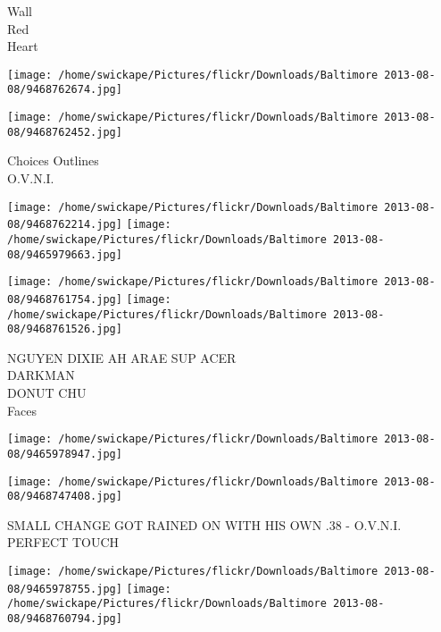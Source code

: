 \documentclass[10pt,letterpaper]{article}
\begin{document}
Wall\\
Red\\
Heart\\
\pagebreak

\texttt{[image: /home/swickape/Pictures/flickr/Downloads/Baltimore 2013-08-08/9468762674.jpg]}

\vspace{0.25in}
\texttt{[image: /home/swickape/Pictures/flickr/Downloads/Baltimore 2013-08-08/9468762452.jpg]}

Choices Outlines\\
O.V.N.I.\\
\pagebreak

\texttt{[image: /home/swickape/Pictures/flickr/Downloads/Baltimore 2013-08-08/9468762214.jpg]}
\texttt{[image: /home/swickape/Pictures/flickr/Downloads/Baltimore 2013-08-08/9465979663.jpg]}

\texttt{[image: /home/swickape/Pictures/flickr/Downloads/Baltimore 2013-08-08/9468761754.jpg]}
\texttt{[image: /home/swickape/Pictures/flickr/Downloads/Baltimore 2013-08-08/9468761526.jpg]}

NGUYEN DIXIE AH ARAE SUP ACER\\
DARKMAN\\
DONUT CHU\\
Faces\\
\pagebreak

\texttt{[image: /home/swickape/Pictures/flickr/Downloads/Baltimore 2013-08-08/9465978947.jpg]}

\vspace{0.25in}
\texttt{[image: /home/swickape/Pictures/flickr/Downloads/Baltimore 2013-08-08/9468747408.jpg]}

SMALL CHANGE GOT RAINED ON WITH HIS OWN .38 {-} O.V.N.I.\\
PERFECT TOUCH\\
\pagebreak

\texttt{[image: /home/swickape/Pictures/flickr/Downloads/Baltimore 2013-08-08/9465978755.jpg]}
\texttt{[image: /home/swickape/Pictures/flickr/Downloads/Baltimore 2013-08-08/9468760794.jpg]}

\texttt{[image: /home/swickape/Pictures/flickr/Downloads/Baltimore 2013-08-08/9468760554.jpg]}
\texttt{[image: /home/swickape/Pictures/flickr/Downloads/Baltimore 2013-08-08/9465978053.jpg]}
\end{document}
